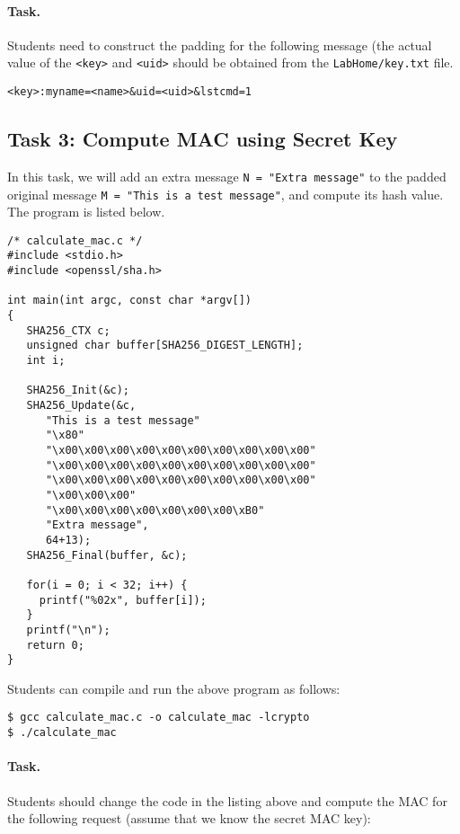 \paragraph{Task.} Students need to construct the padding for the following
message (the actual value of the \texttt{<key>} and \texttt{<uid>} should
be obtained from the \texttt{LabHome/key.txt} file.  

\begin{lstlisting}
<key>:myname=<name>&uid=<uid>&lstcmd=1
\end{lstlisting}



\subsection{Task 3: Compute MAC using Secret Key}

In this task, we will add an extra message \texttt{N = "Extra message"} 
to the padded original message \texttt{M = "This is a test message"}, 
and compute its hash value. The program is listed below. 

\begin{lstlisting}
/* calculate_mac.c */
#include <stdio.h>
#include <openssl/sha.h>

int main(int argc, const char *argv[])
{
   SHA256_CTX c;
   unsigned char buffer[SHA256_DIGEST_LENGTH];
   int i;

   SHA256_Init(&c);
   SHA256_Update(&c,
      "This is a test message"
      "\x80"
      "\x00\x00\x00\x00\x00\x00\x00\x00\x00\x00"
      "\x00\x00\x00\x00\x00\x00\x00\x00\x00\x00"
      "\x00\x00\x00\x00\x00\x00\x00\x00\x00\x00"
      "\x00\x00\x00"
      "\x00\x00\x00\x00\x00\x00\x00\xB0"
      "Extra message",
      64+13);
   SHA256_Final(buffer, &c);

   for(i = 0; i < 32; i++) {
     printf("%02x", buffer[i]);
   }			
   printf("\n");
   return 0;	 
}
\end{lstlisting}

Students can compile and run the above program as follows:

\begin{lstlisting}
$ gcc calculate_mac.c -o calculate_mac -lcrypto
$ ./calculate_mac 
\end{lstlisting}


\paragraph{Task.}
Students should change the code in the listing above and compute 
the MAC for the following request (assume that we know
the secret MAC key):

